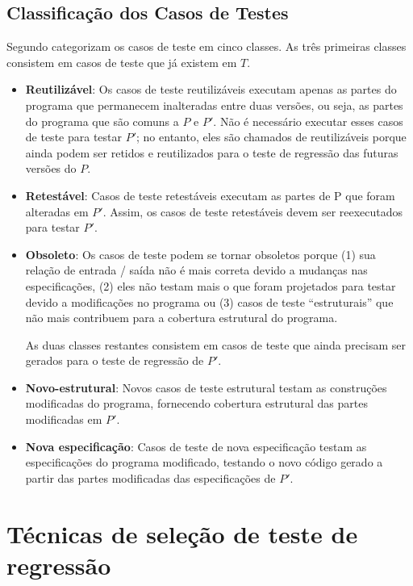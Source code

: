 \subsection{Classificação dos Casos de Testes}


Segundo \cite{Yoo:2012:RTM:2284811.2284813} categorizam os casos de teste em cinco classes. As três primeiras classes consistem em casos de teste que já existem em $T$.

\begin{itemize}
  \item \textbf{Reutilizável}: Os casos de teste reutilizáveis executam apenas as partes do programa que permanecem inalteradas entre duas versões, ou seja, as partes do programa que são comuns a $P$ e $P'$. Não é necessário executar esses casos de teste para testar $P'$; no entanto, eles são chamados de reutilizáveis porque ainda podem ser retidos e reutilizados para o teste de regressão das futuras versões do $P$.
  \item \textbf{Retestável}: Casos de teste retestáveis executam as partes de P que foram alteradas em $P'$. Assim, os casos de teste retestáveis devem ser reexecutados para testar $P'$.
  \item \textbf{Obsoleto}: Os casos de teste podem se tornar obsoletos porque (1) sua relação de entrada / saída não é mais correta devido a mudanças nas especificações, (2) eles não testam mais o que foram projetados para testar devido a modificações no programa ou (3) casos de teste ``estruturais'' que não mais contribuem para a cobertura estrutural do programa.

As duas classes restantes consistem em casos de teste que ainda precisam ser gerados para o teste de regressão de $P'$.

\item \textbf{Novo-estrutural}: Novos casos de teste estrutural testam as construções modificadas do programa, fornecendo cobertura estrutural das partes modificadas em $P'$.


\item \textbf{Nova especificação}: Casos de teste de nova especificação testam as especificações do programa modificado, testando o novo código gerado a partir das partes modificadas das especificações de $P'$.
\end{itemize}

\section{Técnicas de seleção de teste de regressão}\label{sec:rts}


